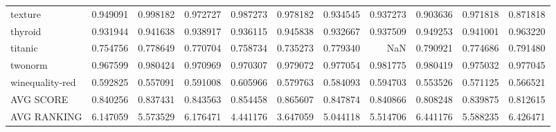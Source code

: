 \begin{tabular}{lrrrrrrrrrr}
texture         &   0.949091 &  0.998182 &  0.972727 &  0.987273 &  0.978182 &  0.934545 &  0.937273 &  0.903636 &  0.971818 &  0.871818 \\
thyroid         &   0.931944 &  0.941638 &  0.938917 &  0.936115 &  0.945838 &  0.932667 &  0.937509 &  0.949253 &  0.941001 &  0.963220 \\
titanic         &   0.754756 &  0.778649 &  0.770704 &  0.758734 &  0.735273 &  0.779340 &       NaN &  0.790921 &  0.774686 &  0.791480 \\
twonorm         &   0.967599 &  0.980424 &  0.970969 &  0.970307 &  0.979072 &  0.977054 &  0.981775 &  0.980419 &  0.975032 &  0.977045 \\
winequality-red &   0.592825 &  0.557091 &  0.591008 &  0.605966 &  0.579763 &  0.584093 &  0.594703 &  0.553526 &  0.571125 &  0.566521 \\
AVG SCORE       &   0.840256 &  0.837431 &  0.843563 &  0.854458 &  0.865607 &  0.847874 &  0.840866 &  0.808248 &  0.839875 &  0.812615 \\
AVG RANKING     &   6.147059 &  5.573529 &  6.176471 &  4.441176 &  3.647059 &  5.044118 &  5.514706 &  6.441176 &  5.588235 &  6.426471 \\
\bottomrule
\end{tabular}
